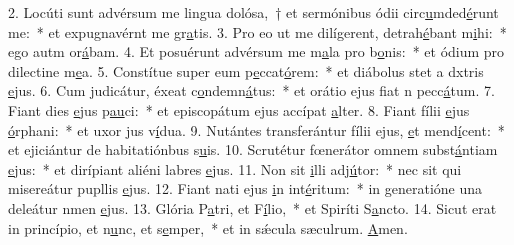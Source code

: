 2. Locúti sunt advérsum me lingua dolósa,~† et sermónibus ódii circ\uline{u}mded\uline{é}runt me:~* et expugnavérnt me gr\uline{a}tis.
3. Pro eo ut me dilígerent, detrah\uline{é}bant m\uline{i}hi:~* ego autm or\uline{á}bam.
4. Et posuérunt advérsum me m\uline{a}la pro b\uline{o}nis:~* et ódium pro dilectine m\uline{e}a.
5. Constítue super eum p\uline{e}ccat\uline{ó}rem:~* et diábolus stet a dxtris \uline{e}jus.
6. Cum judicátur, éxeat c\uline{o}ndemn\uline{á}tus:~* et orátio ejus fiat n pecc\uline{á}tum.
7. Fiant dies \uline{e}jus p\uline{au}ci:~* et episcopátum ejus accípat \uline{a}lter.
8. Fiant fílii \uline{e}jus \uline{ó}rphani:~* et uxor jus v\uline{í}dua.
9. Nutántes transferántur fílii ejus, \uline{e}t mend\uline{í}cent:~* et ejiciántur de habitatiónbus s\uline{u}is.
10. Scrutétur fœnerátor omnem subst\uline{á}ntiam \uline{e}jus:~* et dirípiant aliéni labres \uline{e}jus.
11. Non sit \uline{i}lli adj\uline{ú}tor:~* nec sit qui misereátur pupllis \uline{e}jus.
12. Fiant nati ejus \uline{i}n int\uline{é}ritum:~* in generatióne una deleátur nmen \uline{e}jus.
13. Glória P\uline{a}tri, et F\uline{í}lio,~* et Spiríti S\uline{a}ncto.
14. Sicut erat in princípio, et n\uline{u}nc, et s\uline{e}mper,~* et in sǽcula sæculrum. \uline{A}men.
